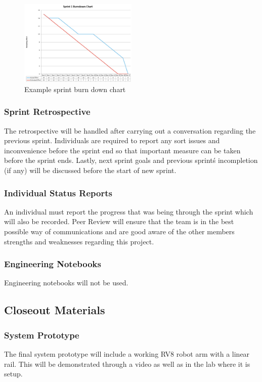 \begin{figure}[h!]
    \centering
    \includegraphics[width=0.5\textwidth]{images/burndown_example.jpg}
    \caption{Example sprint burn down chart}
\end{figure}

\subsubsection{Sprint Retrospective}
The retrospective will be handled after carrying out a conversation regarding the previous sprint. Individuals are required to report any sort issues and inconvenience before the sprint end so that important measure can be taken before the sprint ends. Lastly, next sprint goals and previous sprint\'s incompletion (if any) will be discussed before the start of new sprint.  

\subsubsection{Individual Status Reports}
An individual must report the progress that was being through the sprint which will also be recorded. Peer Review will ensure that the team is in the best possible way of communications and are good aware of the other members strengths and weaknesses regarding this project. 

\subsubsection{Engineering Notebooks}
Engineering notebooks will not be used. 

\subsection{Closeout Materials}

\subsubsection{System Prototype}
The final system prototype will include a working RV8 robot arm with a linear rail. This will be demonstrated through a video as well as in the lab where it is setup. 


